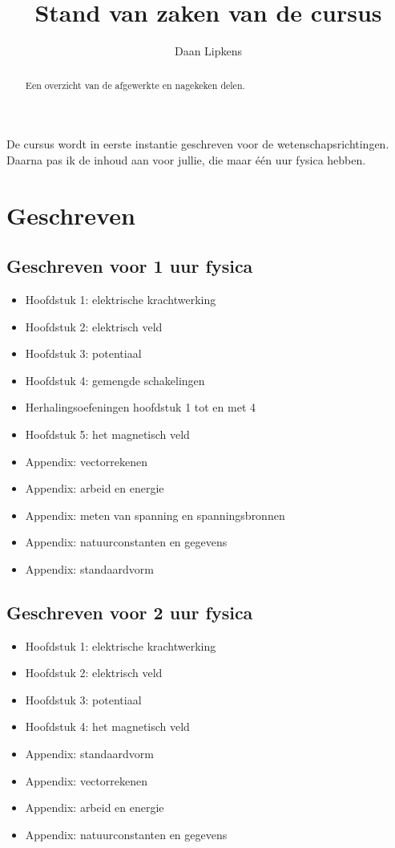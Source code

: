 \documentclass{ximera}
\title{Stand van zaken van de cursus}
\author{Daan Lipkens}
\begin{document}
\begin{abstract}
    Een overzicht van de afgewerkte en nagekeken delen.
\end{abstract}
\maketitle

De cursus wordt in eerste instantie geschreven voor de wetenschapsrichtingen. Daarna pas ik de inhoud aan voor jullie, die maar één uur fysica hebben.

\section*{Geschreven}
\subsection*{Geschreven voor 1 uur fysica}
\begin{itemize}
    \item Hoofdstuk 1: elektrische krachtwerking
    \item Hoofdstuk 2: elektrisch veld
    \item Hoofdstuk 3: potentiaal
    \item Hoofdstuk 4: gemengde schakelingen
    \item Herhalingsoefeningen hoofdstuk 1 tot en met 4
    \item Hoofdstuk 5: het magnetisch veld
    \item Appendix: vectorrekenen
    \item Appendix: arbeid en energie
    \item Appendix: meten van spanning en spanningsbronnen
    \item Appendix: natuurconstanten en gegevens
    \item Appendix: standaardvorm
\end{itemize}

\subsection*{Geschreven voor 2 uur fysica}
\begin{itemize}
    \item Hoofdstuk 1: elektrische krachtwerking
    \item Hoofdstuk 2: elektrisch veld
    \item Hoofdstuk 3: potentiaal
    \item Hoofdstuk 4: het magnetisch veld
    \item Appendix: standaardvorm
    \item Appendix: vectorrekenen
    \item Appendix: arbeid en energie
    \item Appendix: natuurconstanten en gegevens
\end{itemize}
\end{document}
